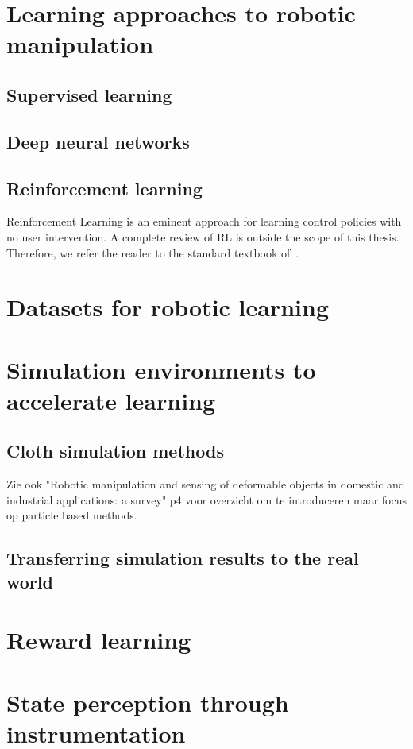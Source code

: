 \documentclass[\home/main.tex]{subfiles}
\begin{document}
\section{Learning approaches to robotic manipulation} \label{sec:lit_learning}

\subsection{Supervised learning} \label{subsec:lit_sl}
\subsection{Deep neural networks} \label{subsec:lit_dnn}
\subsection{Reinforcement learning} \label{subsec:lit_rl}

Reinforcement Learning is an eminent approach for learning control policies with no user intervention. A complete review of RL is outside the scope of this thesis. Therefore, we refer the reader to the standard textbook of~\citeauthor{SuttonAndBarto}.

\section{Datasets for robotic learning} \label{sec:lit_datasets}
\section{Simulation environments to accelerate learning} \label{sec:lit_simulation}
\subsection{Cloth simulation methods} \label{subsec:lit_cloth_sim}
Zie ook "Robotic manipulation and sensing of deformable objects in domestic and industrial applications: a survey" p4 voor overzicht om te introduceren maar focus op particle based methods.
\subsection{Transferring simulation results to the real world}  \label{sec:lit_sim2real}
\section{Reward learning}  \label{sec:lit_reward_learning}
\section{State perception through instrumentation} \label{sec:lit_instrumentation}
\end{document}
